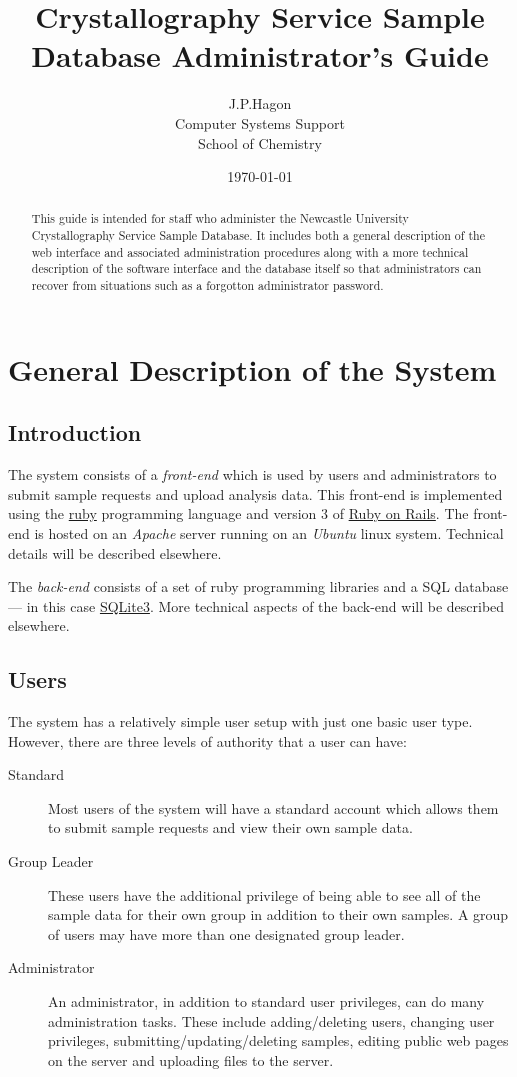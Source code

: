 \documentclass[12pt]{article}
\title{\sffamily\bfseries Crystallography Service Sample Database Administrator's Guide}
\author{J.P.Hagon\\Computer Systems Support\\School of Chemistry}
\date{\today}
\begin{document}
\maketitle
\begin{abstract}
This guide is intended for staff who administer the Newcastle University
Crystallography Service Sample Database.
It includes both a general description of the web interface and 
associated administration procedures along with a more technical
description of the software interface and the database itself so that
administrators can recover from situations such as a forgotton
administrator password.
\end{abstract}
\section{General Description of the System}
\subsection{Introduction}
The system consists of a \emph{front-end} which is used by users
and administrators to submit sample requests and upload analysis data. 
This front-end is implemented using the 
\href{http://www.ruby-lang.org/en/}{ruby} programming language and 
version 3 of \href{http://rubyonrails.org}{Ruby on Rails}.
The front-end is hosted on an \emph{Apache} server running on an
\emph{Ubuntu} linux system. Technical details will be described elsewhere.

The \emph{back-end} consists of a set of ruby programming libraries
and a SQL database --- in this case 
\href{http://www.sqlite.org/}{SQLite3}.
More technical aspects of the back-end will be described elsewhere.

\subsection{Users}

The system has a relatively simple user setup with just one basic user
type. However, there are three levels of authority that a user can have:
\begin{description}
\item[Standard]
Most users of the system will have a standard account which allows them
to submit sample requests and view their own sample data.
\item[Group Leader]
These users have the additional privilege of being able to see all
of the sample data for their own group in addition to their own
samples. A group of users may have more than one designated group leader.
\item[Administrator]
An administrator, in addition to standard user privileges, can do many
administration tasks. These include adding/deleting users, changing user
privileges, submitting/updating/deleting samples, editing public web
pages on the server and uploading files to the server.
\end{description}
\end{document}
